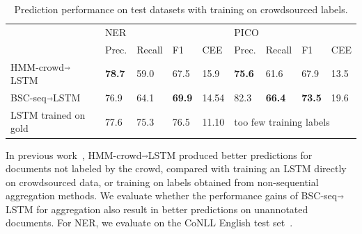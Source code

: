 \begin{table}
\small
\begin{tabularx}{\textwidth}{ l X X X X X X X X}
\toprule
 & \multicolumn{4}{l}{NER} & \multicolumn{4}{l}{PICO}\\ 
& Prec. & Recall & F1 & CEE & Prec. & Recall & F1 & CEE  \\ \midrule
HMM-crowd$\Arrow{0.2cm}$LSTM & \textbf{78.7} & 59.0 & 67.5 & 15.9  & \textbf{75.6} & 61.6 & 67.9 & 13.5 \\
BSC-seq$\Arrow{0.2cm}$LSTM & 76.9 & 64.1 & \textbf{69.9} & 14.54 & 82.3 & \textbf{66.4} & \textbf{73.5} & 19.6  \\
LSTM trained on gold & 77.6 & 75.3 & 76.5 & 11.10 & \multicolumn{4}{l}{too few training labels} \\
\bottomrule
\end{tabularx}
\caption{Prediction performance on test datasets with training on crowdsourced labels.}
\label{tab:prediction_results}
\end{table}
In previous work~\cite{nguyen2017aggregating}, HMM-crowd$\Arrow{.2cm}$LSTM
produced better predictions for documents not labeled by the crowd, compared with 
training an LSTM directly on crowdsourced data, or training
on labels obtained from non-sequential aggregation methods. 
We evaluate whether the performance gains of BSC-seq$\Arrow{.2cm}$LSTM for aggregation also result in better predictions 
on unannotated documents. 
For NER, we evaluate on the CoNLL English test set~\cite{tjong2003introduction}.

